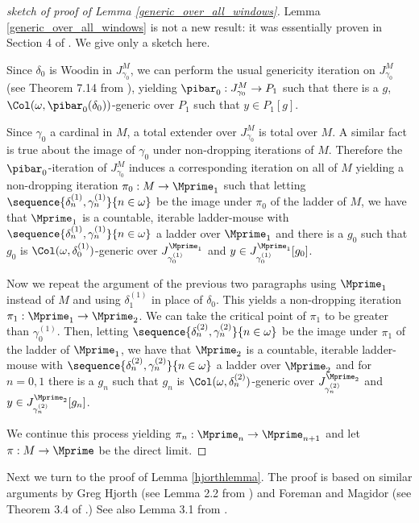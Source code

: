 \documentclass[oneside,12pt]{amsart}
\begin{document}
\begin{proof}[sketch of proof of Lemma \ref{generic_over_all_windows}]
Lemma \ref{generic_over_all_windows} is not a new result: it was essentially
proven in Section 4 of \cite{Mouse_Sets}. We give only a sketch here.

Since $\delta_0$ is Woodin in $J^M_{\gamma_0}$,
we can perform the usual genericity iteration on $J^M_{\gamma_0}$
(see Theorem 7.14 from \cite{Outline}), yielding
$\pibar_0:J^M_{\gamma_0}\to P_1$ such that
there is a $g$, $\Col(\omega,\pibar_0(\delta_0))$-generic over $P_1$ such that $y\in P_1[g]$.

Since $\gamma_0$ a cardinal in $M$, a total extender over $J^M_{\gamma_0}$ is total
over $M$. A similar fact is true about the image of $\gamma_0$ under non-dropping
iterations of $M$.
Therefore the $\pibar_0$-iteration of $J^M_{\gamma_0}$ induces a corresponding iteration on all of $M$
yielding a non-dropping iteration $\pi_0:M\to \Mprime_1$ such that
letting $\sequence{\delta^{(1)}_n,\gamma^{(1)}_n}{n\in\omega}$ be the image under $\pi_0$
of the ladder of $M$, we have that $\Mprime_1$ is a countable, iterable ladder-mouse
with $\sequence{\delta^{(1)}_n,\gamma^{(1)}_n}{n\in\omega}$ a ladder over $\Mprime_1$
and there is a $g_0$ such that $g_0$
is $\Col(\omega,\delta^{(1)}_0)$-generic over
$J^{\Mprime_1}_{\gamma^{(1)}_0}$ and $y\in J^{\Mprime_1}_{\gamma^{(1)}_0}[g_0]$.

Now we repeat the argument of the previous two paragraphs using $\Mprime_1$ instead of $M$
and using $\delta^{(1)}_1$ in place of $\delta_0$. This yields a non-dropping iteration
$\pi_1:\Mprime_1\to\Mprime_2$. We can take the critical point of $\pi_1$ to be
greater than $\gamma^{(1)}_0$. Then,
letting $\sequence{\delta^{(2)}_n,\gamma^{(2)}_n}{n\in\omega}$ be the image under $\pi_1$
of the ladder of $\Mprime_1$, we have that $\Mprime_2$ is a countable, iterable ladder-mouse
with $\sequence{\delta^{(2)}_n,\gamma^{(2)}_n}{n\in\omega}$ a ladder over $\Mprime_2$
and for $n=0,1$ there is a $g_n$ such that $g_n$
is $\Col(\omega,\delta^{(2)}_n)$-generic over
$J^{\Mprime_2}_{\gamma^{(2)}_n}$ and $y\in J^{\Mprime_2}_{\gamma^{(2)}_n}[g_n]$.

We continue this process yielding $\pi_n:\Mprime_n\to\Mprime_{n+1}$ and
let $\pi:M\to\Mprime$ be the direct limit.

\end{proof}

Next we turn to the proof of Lemma \ref{hjorthlemma}.
The proof is based on similar arguments by Greg Hjorth (see Lemma 2.2 from \cite{Hjorth_applications_of_course_imt}) and Foreman and Magidor (see Theorem 3.4 of \cite{Foreman_and_Magidor}.)
See also Lemma 3.1 from \cite{Schlict_Thin_Equivalence_Relations}.
\end{document}
